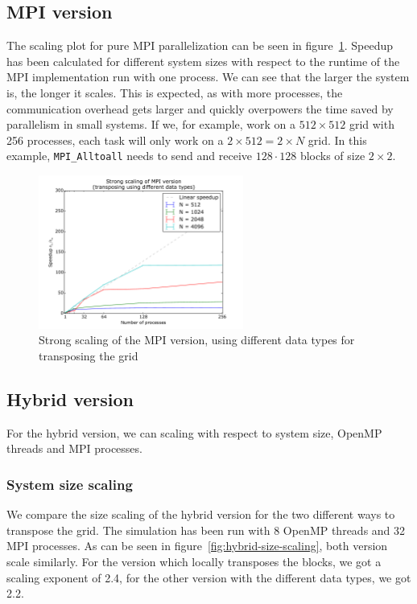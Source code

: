 \documentclass[a4paper]{article}
\begin{document}
\subsection{MPI version}\label{sec:mpi-scaling}
The scaling plot for pure MPI parallelization can be seen in figure~\ref{fig:mpi-strong-scaling-data}.
Speedup has been calculated for different system sizes with respect to the runtime of the MPI implementation run with one process.
We can see that the larger the system is, the longer it scales.
This is expected, as with more processes, the communication overhead gets larger and quickly overpowers the time saved by parallelism in small systems.
If we, for example, work on a $512 \times 512$ grid with 256 processes, each task will only work on a $2 \times 512 = 2 \times N$ grid.
In this example, \verb|MPI_Alltoall| needs to send and receive $128 \cdot 128$ blocks of size $2 \times 2$.

\begin{figure}
	\centering
	\includegraphics[width=0.6\textwidth]{mpi_data_strong_scaling_vs_1proc.pdf}
	\caption{Strong scaling of the MPI version, using different data types for transposing the grid}
	\label{fig:mpi-strong-scaling-data}
\end{figure}


\subsection{Hybrid version}
For the hybrid version, we can scaling with respect to system size, OpenMP threads and MPI processes.

\subsubsection{System size scaling}
We compare the size scaling of the hybrid version for the two different ways to transpose the grid.
The simulation has been run with 8 OpenMP threads and 32 MPI processes.
As can be seen in figure~\ref{fig:hybrid-size-scaling}, both version scale similarly.
For the version which locally transposes the blocks, we got a scaling exponent of 2.4, for the other version with the different data types, we got 2.2.
\end{document}
